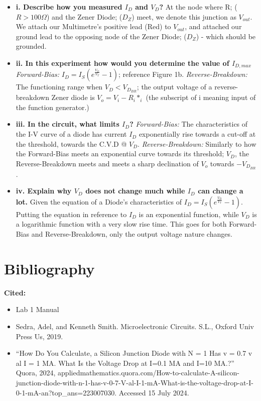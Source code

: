\documentclass[9pt,a4paper]{report}
\newcommand*{\nsection}[1]{%
	\section*{#1}%
	\addcontentsline{toc}{section}{#1}}
\begin{document}
	\begin{itemize}
		\item \textbf{i. Describe how you measured $I_D$ and $V_D$?}
		\subitem At the node where R; ($R>100\Omega$) and the Zener Diode; ($D_Z$) meet, we denote this junction as $V_{out}$. We attach our Multimetre's positive lead (Red) to $V_{out}$, and attached our ground lead to the opposing node of the Zener Diode; ($D_Z$) - which should be grounded.
		\item \textbf{ii. In this experiment how would you determine the value of $I_{D,max}$}
		\subitem \emph{Forward-Bias:} $I_D=I_S(e^{\frac{V_D}{V_T}}-1)$; reference Figure 1b.
		\subitem \emph{Reverse-Breakdown:} The functioning range when $V_D < V_{D_{BR}}$; the output voltage of a reverse-breakdown Zener diode is $V_o=V_i-R_i*_i$ (the subscript of i meaning input of the function generator.)
		\item \textbf{iii. In the circuit, what limits $I_D$?}
		\subitem \emph{Forward-Bias:} The characteristics of the I-V curve of a diode has current $I_D$ exponentially rise towards a cut-off at the threshold, towards the C.V.D @ $V_D$.
		\subitem \emph{Reverse-Breakdown:} Similarly to how the Forward-Bias meets an exponential curve towards its threshold; $V_D$, the Reverse-Breakdown meets and meets a sharp declination of $V_o$ towards $-V_{D_{BR}}$.
		\item \textbf{iv. Explain why $V_D$ does not change much while $I_D$ can change a lot.}
		\subitem Given the equation of a Diode's characteristics of $I_D=I_S(e^{\frac{V_D}{V_T}}-1)$. Putting the equation in reference to $I_D$ is an exponential function, while $V_D$ is a logarithmic function with a very slow rise time. This goes for both Forward-Bias and Reverse-Breakdown, only the output voltage nature changes.
	\end{itemize}
	\newpage
	\newpage
	\nsection{Bibliography}
	\textbf{Cited:}\\
	\begin{itemize}
		\item Lab 1 Manual
		\item Sedra, Adel, and Kenneth Smith. Microelectronic Circuits. S.L., Oxford Univ Press Us, 2019.
		\item “How Do You Calculate, a Silicon Junction Diode with N = 1 Has v = 0.7 v al I = 1 MA. What Is the Voltage Drop at I=0.1 MA and I=10 MA.?” Quora, 2024, appliedmathematics.quora.com/How-to-calculate-A-silicon-junction-diode-with-n-1-has-v-0-7-V-al-I-1-mA-What-is-the-voltage-drop-at-I-0-1-mA-an?top\_ans=223007030. Accessed 15 July 2024.
	\end{itemize}
\end{document}
